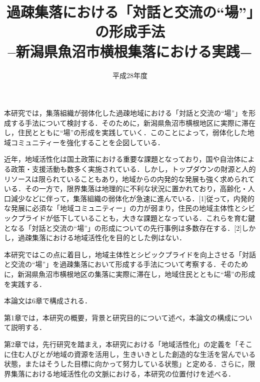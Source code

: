 \documentclass[a4paper]{jsarticle}
\begin{document}
 \masterthesis


\title{過疎集落における「対話と交流の“場”｣の形成手法\\
–新潟県魚沼市横根集落における実践−
}
\date{平成28年度}
\maketitle


\setcounter{page}{1} %
\par
本研究では，集落組織が弱体化した過疎地域における「対話と交流の“場”」を形成する手法について検討する．そのために，新潟県魚沼市横根地区に実際に滞在し，住民とともに“場”の形成を実践していく．このことによって，弱体化した地域コミュニティーを強化することを企図している．\par
近年，地域活性化は国土政策における重要な課題となっており，国や自治体による政策・支援活動も数多く実施されている．しかし，トップダウンの財源と人的リソースは限られていることもあり，地域からの内発的な発展も強く求められている．その一方で，限界集落は地理的に不利な状況に置かれており，高齢化・人口減少などに伴って，集落組織の弱体化が急速に進んでいる．[1]従って，内発的な発展に必須な「地域コミュニティー」の力が弱まり，住民の地域主体性とシビックプライドが低下していることも，大きな課題となっている．これらを育む鍵となる「対話と交流の“場”」の形成についての先行事例は多数存在する．[2]しかし，過疎集落における地域活性化を目的とした例はない．\par
本研究ではこの点に着目し，地域主体性とシビックプライドを向上させる「対話と交流の“場”」を過疎集落において形成する手法について考察する．そのために，新潟県魚沼市横根地区の集落に実際に滞在し，地域住民とともに“場”の形成を実践する．\par
本論文は6章で構成される．\par
第1章では，本研究の概要，背景と研究目的について述べ，本論文の構成について説明する．\par
第2章では，先行研究を踏まえ，本研究における「地域活性化」の定義を「そこに住む人びとが地域の資源を活用し，生きいきとした創造的な生活を営んでいる状態，またはそうした目標に向かって努力している状態」と定める．さらに，限界集落における地域活性化の文脈における，本研究の位置付けを述べる．\par
\end{document}
